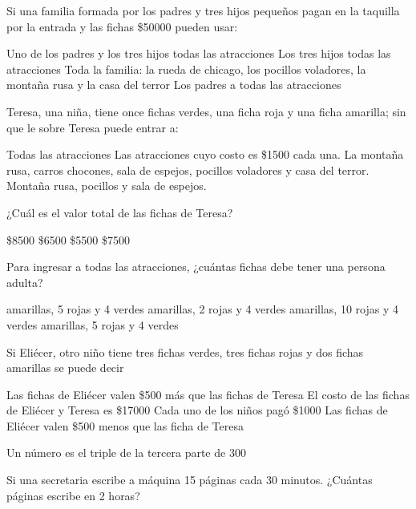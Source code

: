 \documentclass[10pt,letterpaper,addpoints]{exam}
\begin{document}
\begin{questions}
\question \label{firstquest}
Si una familia formada por los padres y tres hijos pequeños pagan en la taquilla por la entrada y las fichas \$50000 pueden usar:
\begin{choices}
\choice Uno de los padres y los tres hijos todas las atracciones
\choice Los tres hijos todas las atracciones
\CorrectChoice Toda la familia: la rueda de chicago, los pocillos voladores, la montaña rusa y la casa del terror
\choice Los padres a todas las atracciones
\end{choices}
\question
Teresa, una niña, tiene once fichas verdes, una ficha roja y una ficha amarilla; sin que le sobre Teresa puede entrar a:
\begin{choices}
\choice Todas las atracciones
\choice Las atracciones cuyo costo es \$1500 cada una.
\CorrectChoice La montaña rusa, carros chocones, sala de espejos, pocillos voladores y casa del terror.
\choice Montaña rusa, pocillos y sala de espejos.
\end{choices}
\question
¿Cuál es el valor total de las fichas de Teresa?

\begin{oneparchoices}
\CorrectChoice \$8500
\choice \$6500
\choice \$5500
\choice \$7500
\end{oneparchoices}
\question
Para ingresar a todas las atracciones, ¿cuántas fichas  debe tener una persona adulta?

\begin{oneparchoices}
 amarillas, 5 rojas y 4 verdes
 amarillas, 2 rojas y 4 verdes
 amarillas, 10 rojas y 4 verdes
 amarillas, 5 rojas y 4 verdes
\end{oneparchoices}
\question \label{lastquest}
Si Eli\'ecer, otro niño tiene tres fichas verdes, tres fichas rojas y dos fichas amarillas se puede decir
\begin{choices}
\choice Las fichas de Eli\'ecer valen \$500 m\'as que las fichas de Teresa
\CorrectChoice El costo de las fichas de Eli\'ecer y Teresa es \$17000
\choice Cada uno de los niños pag\'o \$1000
\choice Las fichas de Eli\'ecer valen \$500 menos que las ficha de Teresa
\end{choices}
\question Un número es el triple de la tercera parte de 300

\begin{oneparchoices}
\end{oneparchoices}
\question
Si una secretaria escribe a máquina 15 páginas cada 30 minutos. ¿Cuántas páginas escribe en 2 horas?


\end{questions}
\end{document}
